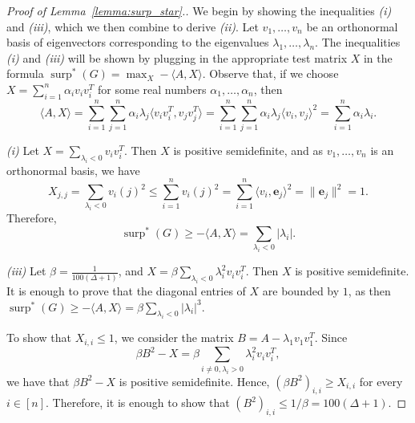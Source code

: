\documentclass[11pt]{article}
\theoremstyle{plain}
\theoremstyle{definition}
\DeclareMathOperator{\surp}{surp}
\begin{document}
\begin{proof}[Proof of Lemma~\ref{lemma:surp_star}.]
We begin by showing the inequalities \textit{(i)} and \textit{(iii)}, which we then combine to derive \textit{(ii)}. Let $v_1,\dots,v_n$ be an orthonormal basis of eigenvectors corresponding to the eigenvalues $\lambda_1,\dots,\lambda_n$. The inequalities \textit{(i)} and \textit{(iii)} will be shown by plugging in the appropriate test matrix $X$ in the formula $\surp^*(G)= \max_X -\langle A, X\rangle$. Observe that, if we choose $X=\sum_{i=1}^n\alpha_i v_iv_i^T$ for some real numbers $\alpha_1,\dots,\alpha_n$, then
$$\langle A,X\rangle=\sum_{i=1}^n\sum_{j=1}^n\alpha_i\lambda_j \langle v_iv_i^T,v_jv_j^T\rangle=\sum_{i=1}^n\sum_{j=1}^n\alpha_i\lambda_j \langle v_i,v_j\rangle^2=\sum_{i=1}^n\alpha_i\lambda_i.$$

\textit{(i)} Let $X=\sum_{\lambda_i<0} v_iv_i^T$. Then $X$ is positive semidefinite, and as $v_1,\dots,v_n$ is an orthonormal basis, we have $$X_{j,j}=\sum_{\lambda_i<0}v_i(j)^2\leq\sum_{i=1}^n v_i(j)^2=\sum_{i=1}^n \langle v_i, \mathbf{e}_j\rangle^2= \|\mathbf{e}_j\|^2=1.$$ Therefore, \[\surp^*(G)\geq -\langle A,X\rangle=\sum_{\lambda_i<0}|\lambda_{i}|.\]

\textit{(iii)} Let $\beta=\frac{1}{100(\Delta+1)}$, and $X=\beta\sum_{\lambda_i<0} \lambda_i^2v_iv_i^T$. Then $X$ is positive semidefinite. It is enough to prove that the diagonal entries of $X$ are bounded by $1$, as then $\surp^*(G)\geq -\langle A,X\rangle =\beta\sum_{\lambda_i<0}|\lambda_{i}|^3$. 

To show that  $X_{i,i}\leq 1$, we consider the matrix $B=A-\lambda_1v_1v_1^T$. Since $$\beta B^2-X=\beta\sum_{i\neq 0,\lambda_i>0}\lambda_i^2v_iv_i^T,$$ we have that $\beta B^2-X$ is positive semidefinite. Hence, $(\beta B^2)_{i,i}\geq X_{i,i}$ for every $i\in [n]$. Therefore, it is enough to show that $(B^2)_{i,i}\leq 1/\beta=100(\Delta+1)$. 


\end{proof}
\end{document}
